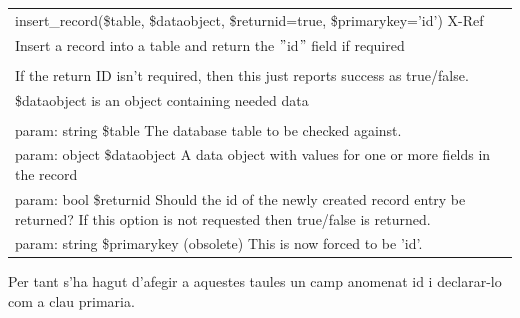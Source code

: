 \documentclass[a4paper]{report}  %
\begin{document}
\begin{tt}
\begin{center}
 	\begin{tabular}{| p{12cm} |}
	\hline
	\rowcolor[gray]{0.5}insert\_record(\$table, \$dataobject, \$returnid=true, \$primarykey='id') X-Ref\\
	Insert a record into a table and return the $"$id$"$ field if required\\
	\hline \\
	If the return ID isn't required, then this just reports success as true/false.\\
	\$dataobject is an object containing needed data\\
	\\
	param: string \$table The database table to be checked against.\\
	param: object \$dataobject A data object with values for one or more fields in the record\\
	param: bool \$returnid Should the id of the newly created record entry be returned? If this option is not requested then true/false is returned.\\
	param: string \$primarykey (obsolete) This is now forced to be 'id'. \\
	\hline
	\end{tabular}
\end{center}	
\end{tt}	
Per tant s'ha hagut d'afegir a aquestes taules un camp anomenat id i declarar-lo com a clau primaria.
\end{document}
